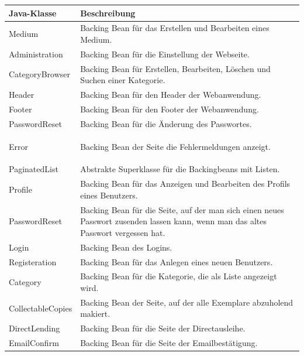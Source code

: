 \documentclass{article}
\begin{document}
\begin{center}
    \begin{table}
        \begin{tabular} { |p{}|p{}| }
            \hline
            Java-Klasse & Beschreibung  \\
            \hline\hline
            Medium & Backing Bean für das Erstellen und Bearbeiten eines Medium.\\
            \hline
            Administration & Backing Bean für die Einstellung der Webseite.\\
            \hline
            CategoryBrowser & Backing Bean für Erstellen, Bearbeiten, Löschen und Suchen einer Kategorie.\\
            \hline
            Header & Backing Bean für den Header der Webanwendung. \\
            \hline
            Footer & Backing Bean für den Footer der Webanwendung. \\
            \hline
            PasswordReset & Backing Bean für die Änderung des Passwortes.\\
            \hline
            \hypertarget{invalidaccess}{Error} & Backing Bean der Seite die Fehlermeldungen anzeigt.\\
            \hline
            PaginatedList & Abstrakte Superklasse für die Backingbeans mit Listen.\\
            \hline
            Profile & Backing Bean für das Anzeigen und Bearbeiten des Profils eines Benutzers. \\
            \hline
            PasswordReset & Backing Bean für die Seite, auf der man sich einen neues Passwort zusenden lassen kann, wenn man das altes Passwort vergessen hat.\\
            \hline
            Login & Backing Bean des Logins.\\
            \hline
            Registeration & Backing Bean für das Anlegen eines neuen Benutzers.\\
            \hline
            Category & Backing Bean für die Kategorie, die als Liste angezeigt wird.\\
            \hline
            CollectableCopies & Backing Bean der Seite, auf der alle Exemplare abzuholend makiert. \\
            \hline
            DirectLending & Backing Bean für die Seite der Directausleihe.\\
            \hline
            EmailConfirm & Backing Bean für die Seite der Emailbestätigung.\\

\end{tabular}
\end{table}
\end{center}
\end{document}
